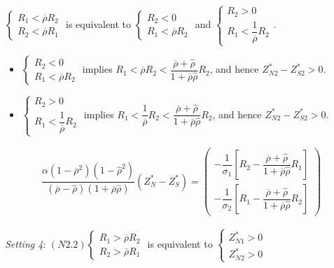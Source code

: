 \documentclass[10pt]{article}
\begin{document}
$ \left\{ \begin{matrix} R_1 < \overline{\rho} R_2 \\ R_2 < \overline{\rho} R_1 \end{matrix} \right. $ is equivalent to $ \left\{ \begin{matrix} R_2 < 0 \\ R_1 < \overline{\rho} R_2 \end{matrix} \right. $ and $ \left\{ \begin{matrix} R_2 > 0 \\ R_1 < \dfrac{1}{\overline{\rho}} R_2 \end{matrix} \right. $. 
\begin{itemize}
\item $ \left\{ \begin{matrix} R_2 < 0 \\ R_1 < \overline{\rho} R_2 \end{matrix} \right. $ implies $ R_1 < \overline{\rho} R_2 < \dfrac{\overline{\rho} + {\hat \rho}}{1 + \overline{\rho} {\hat \rho}} R_2 $, and hence $ Z_{N 2}^* - Z_{S 2}^* > 0 $.
\item $ \left\{ \begin{matrix} R_2 > 0 \\ R_1 < \dfrac{1}{\overline{\rho}} R_2 \end{matrix} \right. $ implies $ R_1 < \dfrac{1}{\overline{\rho}} R_2 < \dfrac{\overline{\rho} + {\hat \rho}}{1 + \overline{\rho} {\hat \rho}} R_2 $, and hence $ Z_{N 2}^* - Z_{S 2}^* > 0 $.
\end{itemize}

\begin{eqnarray*}
\dfrac{\alpha (1 - \overline{\rho}^2) (1 - {\hat \rho}^2)}{(\overline{\rho} - {\hat \rho}) (1 + \overline{\rho} {\hat \rho})} (Z_N^* - Z_S^*) = \left( \begin{matrix} - \dfrac{1}{\sigma_1} \left[ R_2 - \dfrac{\overline{\rho} + {\hat \rho}}{1 + \overline{\rho} {\hat \rho}} R_1 \right] \\ - \dfrac{1}{\sigma_2} \left[ R_1 - \dfrac{\overline{\rho} + {\hat \rho}}{1 + \overline{\rho} {\hat \rho}} R_2 \right] \end{matrix} \right)
\end{eqnarray*}

{\it Setting 4}: $ (N2.2) \left\{ \begin{matrix} R_1 > \overline{\rho} R_2 \\ R_2 > \overline{\rho} R_1 \end{matrix} \right. $ is equivalent to $ \left\{ \begin{matrix} Z_{N 1}^* > 0 \\ Z_{N 2}^* > 0 \end{matrix} \right. $
\end{document}

